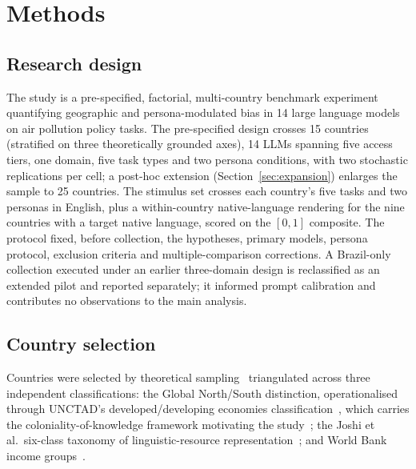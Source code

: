 \section{Methods}
\label{sec:methods}

\subsection{Research design}

The study is a pre-specified, factorial, multi-country benchmark experiment
quantifying geographic and persona-modulated bias in 14 large language models on
air pollution policy tasks. The pre-specified design crosses 15 countries
(stratified on three theoretically grounded axes), 14 LLMs spanning five access
tiers, one domain, five task types and two persona conditions, with two
stochastic replications per cell; a post-hoc extension
(Section~\ref{sec:expansion}) enlarges the sample to 25 countries. The stimulus
set crosses each country's five tasks and two personas in English, plus a
within-country native-language rendering for the nine countries with a target
native language, scored on the $[0,1]$ composite. The protocol fixed, before
collection, the hypotheses, primary models, persona protocol, exclusion criteria
and multiple-comparison corrections. A Brazil-only collection executed under an
earlier three-domain design is reclassified as an extended pilot and reported
separately; it informed prompt calibration and contributes no observations to
the main analysis.

\subsection{Country selection}

Countries were selected by theoretical sampling~\citep{patton2015qualitative}
triangulated across three independent classifications: the Global North/South
distinction, operationalised through UNCTAD's developed/developing economies
classification~\citep{unctad2024classification}, which carries the
coloniality-of-knowledge framework motivating the
study~\citep{mohamed2020decolonial}; the Joshi et al.\ six-class taxonomy of
linguistic-resource representation~\citep{joshi2020state}; and World Bank income
groups~\citep{worldbank2025classification}.

